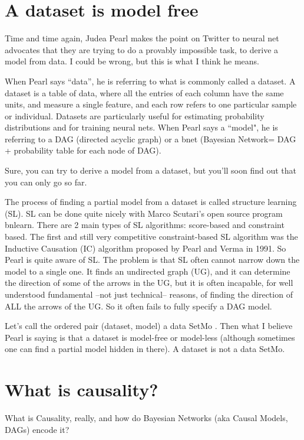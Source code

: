 \section{A dataset is model free}
Time and time again, Judea Pearl makes the point on Twitter to neural net
advocates that they are trying to do a provably impossible task, to derive a
model from data. I could be wrong, but this is what I think he means.

When Pearl says ``data”, he is referring to what is commonly called a dataset.
A dataset is a table of data, where all the entries of each column have the
same units, and measure a single feature, and each row refers to one
particular sample or individual. Datasets are particularly useful for
estimating probability distributions and for training neural nets. When Pearl
says a ``model", he is referring to a DAG (directed acyclic graph) or a bnet
(Bayesian Network= DAG + probability table for each node of DAG).

Sure, you can try to derive a model from a dataset, but you’ll soon find out
that you can only go so far.

The process of finding a partial model from a dataset is called structure
learning (SL).  SL can be done quite nicely with Marco Scutari’s open source
program bnlearn. There are 2 main types of SL algorithms: score-based and
constraint based. The first and still very competitive constraint-based SL
algorithm was the Inductive Causation (IC) algorithm proposed by Pearl and
Verma in 1991. So Pearl is quite aware of SL. The problem is that SL often
cannot narrow down the model to a single one. It finds an undirected graph
(UG), and it can determine the direction of some of the arrows in the UG, but
it is often incapable, for well understood fundamental --not just technical--
reasons, of finding the direction of ALL the arrows of the UG. So it often
fails to fully specify a DAG model.

Let’s call the ordered pair (dataset, model) a data SetMo . Then what I
believe Pearl is saying is that a dataset is model-free or model-less
(although sometimes one can find a partial model hidden in there). A dataset
is not a data SetMo.

\section{What is causality?}
What is Causality, really, and how do Bayesian Networks (aka Causal Models,
DAGs) encode it?

